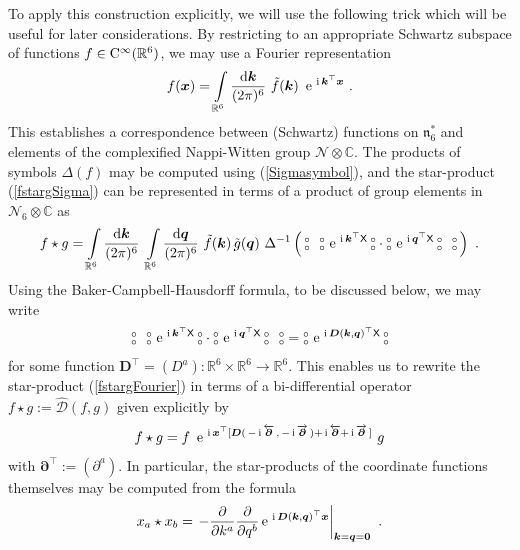 \documentclass[11pt,a4paper]{article}
\newcommand{\NO}{\mbox{$\substack{\circ\\\circ}$}}      %
\newcommand{\ii}{{\rm i}}
\newcommand{\mbf}[1]{{\boldsymbol {#1} }}
\def\ii{{\,{\rm i}\,}}
\def\dd{{\rm d}}
\def\CC{{\rm C}}
\def\X{{\sf X}}
\def\mx{{\mbf x}}
\def\mk{{\mbf k}}
\def\mq{{\mbf q}}
\def\mD{{\mbf D}}
\def\mdell{{\mbf\partial}}
\def\mfn{{\mathfrak n}}
\newcommand{\complex}{{\mathbb C}} %
\newcommand{\real}{{\mathbb R}} %
\def\e{{\,\rm e}\,}
\newcommand{\beq}{\begin{eqnarray}}
\newcommand{\eeq}{\end{eqnarray}}
\begin{document}
To apply this construction explicitly, we will use the following trick
which will be useful for later considerations. By restricting to an
appropriate Schwartz subspace of functions $f\in\CC^\infty(\real^6)$,
we may use a Fourier representation
\beq
f(\mx)=\int\limits_{\real^6}\frac{\dd\mk}{(2\pi)^6}~\tilde f(\mk)~
\e^{\ii\mk^\top\mx} \ .
\label{Fouriertransfdef}\eeq
This establishes a correspondence between (Schwartz) functions on
$\mfn_6^*$ and elements of the complexified Nappi-Witten group
$\mathcal{N}\otimes\complex$. The products of symbols $\Delta(f)$
may be computed using (\ref{Sigmasymbol}), and the star-product
(\ref{fstargSigma}) can be represented in terms of a product of group
elements in $\mathcal{N}_6\otimes\complex$ as
\beq
f\star g=\int\limits_{\real^6}\frac{\dd\mk}{(2\pi)^6}~
\int\limits_{\real^6}\frac{\dd\mq}{(2\pi)^6}~\tilde f(\mk)\,
\tilde g(\mq)~\Delta^{-1}\left(\,\NO~~\NO\,\e^{\ii\mk^\top\X}\,\NO\cdot
\NO\,\e^{\ii\mq^\top\X}\,\NO~~\NO\,\right) \ .
\label{fstargFourier}\eeq
Using the Baker-Campbell-Hausdorff formula, to be discussed below, we
may write
\beq
\NO~~\NO\,\e^{\ii\mk^\top\X}\,\NO\cdot\NO\,\e^{\ii\mq^\top\X}\,\NO~~\NO=
\NO\,\e^{\ii\mD(\mk,\mq)^\top\X}\,\NO
\label{NOproductsBCH}\eeq
for some function $\mD^\top=(D^a):\real^6\times\real^6\to\real^6$. This
enables us to rewrite the star-product (\ref{fstargFourier}) in terms
of a bi-differential operator $f\star g:=\hat{\mathcal{D}}(f,g)$ given
explicitly by
\beq
f\star
g=f~\e^{\ii\mx^\top[\mD(\,-\ii\overleftarrow{\mdell}
\,,\,-\ii\overrightarrow{\mdell}\,)+\ii\overleftarrow{\mdell}+\ii
\overrightarrow{\mdell}\,]}~g
\label{fstargbidiff}\eeq
with $\mdell^\top:=(\partial^a)$. In particular, the star-products of
the coordinate functions themselves may be computed from the formula
\beq
x_a\star x_b=\left.-\frac{\partial}{\partial k^a}\frac\partial
{\partial q^b}\e^{\ii\mD(\mk,\mq)^\top\mx}\right|_{\mk=\mq=\mbf0} \ .
\label{xastarxb}\eeq
\end{document}
